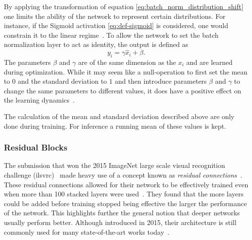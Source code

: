 By applying the transformation of equation \eqref{eq:batch_norm_distribution_shift} one limits the ability of the network to represent certain distributions. For instance, if the Sigmoid activation \eqref{eq:def-sigmoid} is considered, one would constrain it to the linear regime~\cite{Ioffe:2015aaa}. To allow the network to set the batch normalization layer to act as identity, the output is defined as
\begin{equation}
y_i = \gamma\hat{x}_i + \beta.
\end{equation}
The parameters $\beta$ and $\gamma$ are of the same dimension as the $x_i$ and are learned during optimization. While it may seem like a null-operation to first set the mean to $0$ and the standard deviation to $1$ and then introduce parameters $\beta$ and $\gamma$ to change the same parameters to different values, it does have a positive effect on the learning dynamics~\cite{Goodfellow:2016:DNN}.

The calculation of the mean and standard deviation described above are only done during training. For inference a running mean of these values is kept.

\subsubsection{Residual Blocks}
The submission that won the 2015 ImageNet large scale visual recognition challenge (\acrshort{ilsvrc})~\cite{Russakovsky:2015aaa} made heavy use of a concept known as \emph{residual connections}~\cite{He:2015aaa}. These residual connections allowed for their network to be effectively trained even when more than 100 stacked layers were used~\cite{He:2015aaa}. They found that the more layers could be added before training stopped being effective the larger the performance of the network. This highlights further the general notion that deeper networks usually perform better. Although introduced in 2015, their architecture is still commonly used for many state-of-the-art works today~\cite{Elharrouss:2022aaa, Lin:2017aaa, Qiao:2021aaa, Szegedy:2016aaa}.

